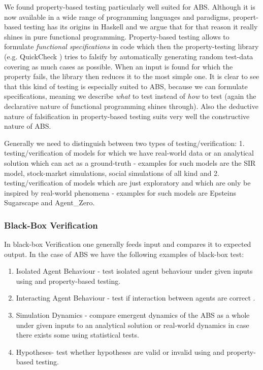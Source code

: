 We found property-based testing particularly well suited for ABS. Although it is now available in a wide range of programming languages and paradigms, propert-based testing has its origins in Haskell \cite{claessen_quickcheck:_2000, claessen_testing_2002} and we argue that for that reason it really shines in pure functional programming. Property-based testing allows to formulate \textit{functional specifications} in code which then the property-testing library (e.g. QuickCheck \cite{claessen_quickcheck:_2000}) tries to falsify by automatically generating random test-data covering as much cases as possible. When an input is found for which the property fails, the library then reduces it to the most simple one. It is clear to see that this kind of testing is especially suited to ABS, because we can formulate specifications, meaning we describe \textit{what} to test instead of \textit{how} to test (again the declarative nature of functional programming shines through). Also the deductive nature of falsification in property-based testing suits very well the constructive nature of ABS.

Generally we need to distinguish between two types of testing/verification: 1. testing/verification of models for which we have real-world data or an analytical solution which can act as a ground-truth - examples for such models are the SIR model, stock-market simulations, social simulations of all kind and 2. testing/verification of models which are just exploratory and which are only be inspired by real-world phenomena - examples for such models are Epsteins Sugarscape and Agent\_Zero.

\subsubsection{Black-Box Verification}
In black-box Verification one generally feeds input and compares it to expected output. In the case of ABS we have the following examples of black-box test:
\begin{enumerate}
	\item Isolated Agent Behaviour - test isolated agent behaviour under given inputs using and property-based testing.
	\item Interacting Agent Behaviour - test if interaction between agents are correct .
	\item Simulation Dynamics - compare emergent dynamics of the ABS as a whole under given inputs to an analytical solution or real-world dynamics in case there exists some using statistical tests.
	\item Hypotheses- test whether hypotheses are valid or invalid using and property-based testing. %
\end{enumerate}

